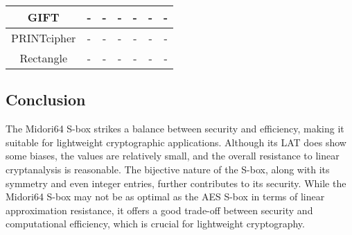 \begin{table}[h!]
{\begin{tabular}{|c|c|c|c|c|c|c|}
			GIFT                 & -                       & -                       & -                      & -                      & -                      & -                      \\ \hline
			PRINTcipher          & -                       & -                       & -                      & -                      & -                      & -                      \\ \hline
			Rectangle            & -                       & -                       & -                      & -                      & -                      & -                      \\ \hline
		\end{tabular}%
	}
\end{table}

\subsection*{Conclusion}

\noindent The Midori64 S-box strikes a balance between security and efficiency,
making it suitable for lightweight cryptographic applications. Although its LAT
does show some biases, the values are relatively small, and the overall
resistance to linear cryptanalysis is reasonable. The bijective nature of the
S-box, along with its symmetry and even integer entries, further contributes to
its security. While the Midori64 S-box may not be as optimal as the AES S-box in
terms of linear approximation resistance, it offers a good trade-off between
security and computational efficiency, which is crucial for lightweight
cryptography.
